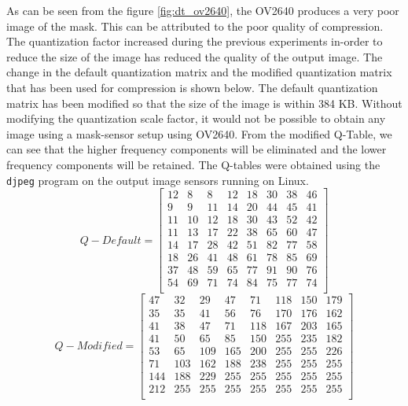 As can be seen from the figure \ref{fig:dt_ov2640}, the OV2640 produces a very poor image of the mask. This can be attributed to the poor quality of compression. The quantization factor increased during the previous experiments in-order to reduce the size of the image has reduced the quality of the output image. The change in the default quantization matrix and the modified quantization matrix that has been used for compression is shown below. The default quantization matrix has been modified so that the size of the image is within 384 KB. Without modifying the quantization scale factor, it would not be possible to obtain any image using a mask-sensor setup using OV2640. From the modified Q-Table, we can see that the higher frequency components will be eliminated and the lower frequency components will be retained. The Q-tables were obtained using the \texttt{djpeg} program\cite{djpeg} on the output image sensors running on Linux. 
\[
Q-Default = 
\begin{bmatrix}
          12  &  8 &   8  & 12 &  18 &  30 &  38&   46 \\
           9   & 9  & 11  & 14  & 20  & 44   &45  & 41 \\
          11  & 10 &  12  & 18 &  30 &  43 &  52 &  42 \\
          11  & 13  & 17   &22  & 38  & 65  & 60  & 47 \\
          14  & 17  & 28  & 42  & 51 &  82 &  77 &  58 \\
          18  & 26  & 41  & 48 &  61  & 78 &  85  & 69 \\
          37  & 48 &  59 &  65 &  77 &  91 &  90 &  76 \\
          54  & 69  & 71  & 74  & 84  & 75  & 77  & 74 \\
\end{bmatrix}
\]
\[
Q-Modified = 
\begin{bmatrix}
   	 47 &  32 &  29 &  47 &  71 & 118 & 150 & 179 \\
          35 &  35 &  41 &  56 &  76 & 170 & 176 & 162\\
          41 &  38 &  47  & 71 & 118 & 167 & 203 & 165\\
          41 &  50 &  65  & 85 & 150 & 255 & 235 & 182\\
          53 &  65 & 109 & 165 & 200 & 255 & 255 & 226\\
          71 & 103 & 162 & 188 & 238 & 255 & 255 & 255\\
         144 & 188 & 229 & 255 & 255 & 255 & 255 & 255\\
         212 & 255 & 255 & 255 & 255 & 255 & 255 & 255\\
\end{bmatrix}
\]

